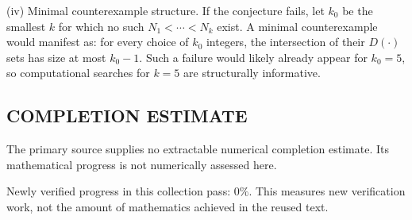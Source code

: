 (iv) Minimal counterexample structure.
If the conjecture fails, let $k_0$ be the smallest $k$ for which no such $N_1<\cdots<N_k$ exist. A minimal counterexample would manifest as: for every choice of $k_0$ integers, the intersection of their $D(\cdot)$ sets has size at most $k_0-1$. Such a failure would likely already appear for $k_0=5$, so computational searches for $k=5$ are structurally informative.




\subsection*{COMPLETION ESTIMATE}
The primary source supplies no extractable numerical completion estimate. Its mathematical progress is not numerically assessed here.

Newly verified progress in this collection pass: $0\%$. This measures new verification work, not the amount of mathematics achieved in the reused text.
